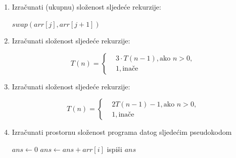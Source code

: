 \begin{enumerate}
\begin{algorithm}[H]
\begin{algorithmic}[1]
                  \EndFor
              \EndIf
          \EndFor
     \EndFor
    \EndProcedure
	\end{algorithmic}
\end{algorithm}


 
 \item Izračunati (ukupnu) složenost sljedeće rekurzije:

\begin{algorithm}[H]
	\begin{algorithmic}[1]
 	  
 		        \State $swap( arr [j] , arr [j+1] )$
 		      \EndIf
 		   \EndFor
 	    \EndFor
		\EndProcedure
	\end{algorithmic}
\end{algorithm}



 
	 
 \item Izračunati složenost sljedeće rekurzije: %
  
 $$	T(n) = 
 \begin{cases}    
         &3\cdot T(n-1), \text{ako }  n > 0 , \\
         & 1, \text{inače} 
   \end{cases}$$

  \item Izračunati složenost sljedeće rekurzije:

$$	T(n) = 
\begin{cases} 
  		&2T(n-1) - 1, \text{ako } n>0, \\
		& 1, \text{inače}
\end{cases}
$$

\item Izračunati prostornu složenost programa datog sljedećim pseudokodom

\begin{algorithm}[H]
	\begin{algorithmic}[1]
		
		\State  $ans \gets 0$
		\State $ans \gets ans+arr[i]$
		\EndFor
		\State ispiši $ans$
		\EndProcedure
	\end{algorithmic}
\end{algorithm}




\end{enumerate}
